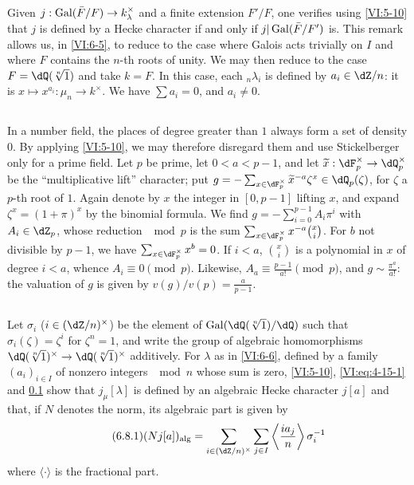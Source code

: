 Given $j:\operatorname{Gal}(\bar F/F) \to k_\lambda^\times$ and a finite extension 
$F'/F$, one verifies using \ref{VI:5-10} that $j$ is defined by a 
Hecke character if and only if $j|\operatorname{Gal}(\bar F/F')$ is. This 
remark allows us, in \ref{VI:6-5}, to reduce to the case where Galois acts 
trivially on $I$ and where $F$ contains the $n$-th roots of 
unity. We may then reduce to the case $F=\dQ(\sqrt[n]{1})$ and 
take $k=F$. In this case, each $_n \lambda_i$ is defined by 
$a_i\in \dZ/n$: it is $x\mapsto x^{a_i}:\mu_n \to k^\times$. We have 
$\sum a_i=0$, and $a_i\ne 0$. 





\subsection{}\label{VI:6-7}

In a number field, the places of degree greater than $1$ always form a 
set of density $0$. By applying \ref{VI:5-10}, we may therefore disregard 
them and use Stickelberger only for a prime field. Let 
$p$ be prime, let $0<a<p-1$, and let $\widetilde x:\dF_p^\times \to \dQ_p^\times$ be the 
``multiplicative lift'' character; put 
  $g=-\sum_{x\in \dF_p^\times} \widetilde x^{-a} \zeta^x\in \dQ_p(\zeta)$, for 
$\zeta$ a $p$-th root of $1$. Again denote by $x$ the integer in $[0,p-1]$ 
  lifting $x$, and expand $\zeta^x=(1+\pi)^x$ by the binomial formula. 
  We find $g=-\sum_{i=0}^{p-1} A_i\pi^i$ with $A_i\in \dZ_p$, whose reduction 
$\mod p$ is the sum $\sum_{x\in \dF_p^\times} x^{-a} \binom x i$. For $b$ not 
divisible by $p-1$, we have $\sum_{x\in \dF_p^\times} x^b=0$. If $i<a$, 
$\binom x i$ is a polynomial in $x$ of degree $i<a$, whence 
$A_i\equiv 0\pmod p$. Likewise, $A_a\equiv \frac{p-1}{a!} \pmod p$, and 
$g\sim \frac{\pi^a}{a!}$: the valuation of $g$ is given by 
$v(g)/v(p) = \frac{a}{p-1}$. 





\subsection{}\label{VI:6-8}

Let $\sigma_i$ ($i\in (\dZ/n)^\times$) be the element of 
$\gal(\dQ(\sqrt[n]{1})/\dQ)$ such that $\sigma_i(\zeta)=\zeta^i$ for $\zeta^n=1$, 
and write the group of algebraic homomorphisms 
$\dQ(\sqrt[n]{1})^\times \to \dQ(\sqrt[n]{1})^\times$ additively. For $\lambda$ as in 
\ref{VI:6-6}, defined by a family 
$(a_i)_{i\in I}$ of nonzero integers $\mod n$ whose sum is zero, 
\ref{VI:5-10}, \eqref{VI:eq:4-15-1} and \ref{VI:6-7} 
show that $j_\mu[\lambda]$ is defined by an algebraic Hecke character 
$j[a]$ and that, if $N$ denotes the norm, its algebraic part is 
given by 
\begin{equation*}\tag{6.8.1}\label{VI:eq:6-8-1}
  (N j[a])_\text{alg} = \sum_{i\in (\dZ/n)^\times} \sum_{j\in I} \left\langle \frac{i a_j}{n} \right\rangle \sigma_i^{-1} 
\end{equation*}
  where $\langle \cdot \rangle$ is the fractional part. 





